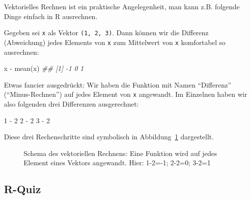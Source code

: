 \documentclass[
  letterpaper,
]{scrbook}
\newenvironment{Shaded}{\begin{snugshade}}{\end{snugshade}}
\newcommand{\DecValTok}[1]{\textcolor[rgb]{0.68,0.00,0.00}{#1}}
\newcommand{\DocumentationTok}[1]{\textcolor[rgb]{0.37,0.37,0.37}{\textit{#1}}}
\newcommand{\FunctionTok}[1]{\textcolor[rgb]{0.28,0.35,0.67}{#1}}
\newcommand{\NormalTok}[1]{\textcolor[rgb]{0.00,0.23,0.31}{#1}}
\newcommand{\SpecialCharTok}[1]{\textcolor[rgb]{0.37,0.37,0.37}{#1}}
\theoremstyle{definition}
\theoremstyle{definition}
\theoremstyle{definition}
\theoremstyle{remark}
\begin{document}
Vektorielles Rechnen ist ein praktische Angelegenheit, man kann z.B.
folgende Dinge einfach in R ausrechnen.

Gegeben sei \texttt{x} als Vektor \texttt{(1,\ 2,\ 3)}. Dann können wir
die Differenz (Abweichung) jedes Elements von \texttt{x} zum Mittelwert
von \texttt{x} komfortabel so ausrechnen:

\begin{Shaded}
\begin{Highlighting}[]
\NormalTok{x }\SpecialCharTok{{-}} \FunctionTok{mean}\NormalTok{(x)}
\DocumentationTok{\#\# [1] {-}1  0  1}
\end{Highlighting}
\end{Shaded}

Etwas fancier ausgedrückt: Wir haben die Funktion mit Namen
\enquote{Differenz} (\enquote{Minus-Rechnen}) auf jedes Element von
\texttt{x} angewandt. Im Einzelnen haben wir also folgenden drei
Differenzen ausgerechnet:

\begin{Shaded}
\begin{Highlighting}[]
\DecValTok{1} \SpecialCharTok{{-}} \DecValTok{2}
\DecValTok{2} \SpecialCharTok{{-}} \DecValTok{2}
\DecValTok{3} \SpecialCharTok{{-}} \DecValTok{2}
\end{Highlighting}
\end{Shaded}

Diese drei Rechenschritte sind symbolisch in
Abbildung~\ref{fig-vektoriell} dargestellt.

\begin{figure}


\caption{\label{fig-vektoriell}Schema des vektoriellen Rechnens: Eine
Funktion wird auf jedes Element eines Vektors angewandt. Hier: 1-2=-1;
2-2=0; 3-2=1}

\end{figure}%

\subsection{R-Quiz}\label{r-quiz}
\end{document}
